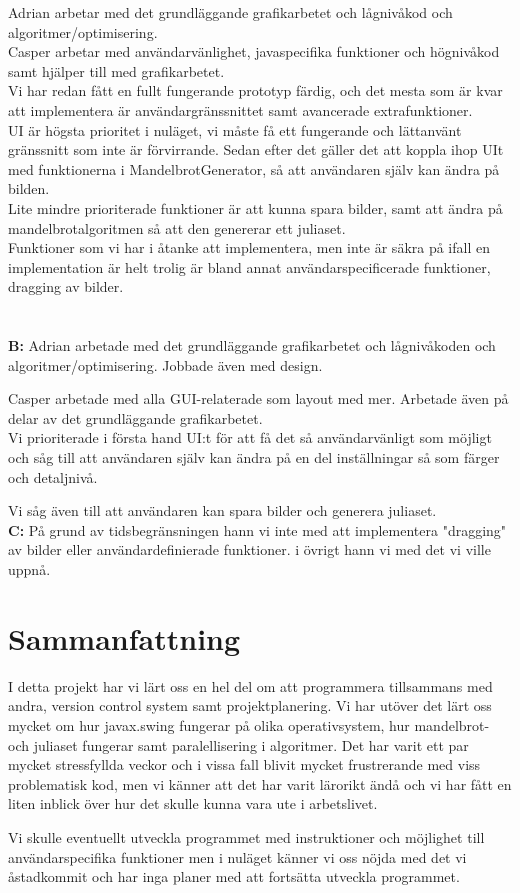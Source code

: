 \documentclass[11pt]{article} %
\begin{document}

\noindent Adrian arbetar med det grundläggande grafikarbetet och lågnivåkod och algoritmer/optimisering. \\

\noindent Casper arbetar med användarvänlighet, javaspecifika funktioner och högnivåkod samt hjälper till med grafikarbetet. \\

\noindent Vi har redan fått en fullt fungerande prototyp färdig, och det mesta som är kvar att implementera är användargränssnittet samt avancerade extrafunktioner. \\

\noindent UI är högsta prioritet i nuläget, vi måste få ett fungerande och lättanvänt gränssnitt som inte är förvirrande. Sedan efter det gäller det att koppla ihop UIt med funktionerna i MandelbrotGenerator, så att användaren själv kan ändra på bilden. \\

\noindent Lite mindre prioriterade funktioner är att kunna spara bilder, samt att ändra på mandelbrotalgoritmen så att den genererar ett juliaset. \\

\noindent Funktioner som vi har i åtanke att implementera, men inte är säkra på ifall en implementation är helt trolig är bland annat användarspecificerade funktioner, dragging av bilder. \\
\\
\\
{\bf B:} \noindent Adrian arbetade med det grundläggande grafikarbetet och lågnivåkoden och algoritmer/optimisering. Jobbade även med design.

\noindent Casper arbetade med alla GUI-relaterade som layout med mer. Arbetade även på delar av det grundläggande grafikarbetet.
\\
\noindent Vi prioriterade i första hand UI:t för att få det så användarvänligt som möjligt och såg till att användaren själv kan ändra på en del inställningar så som färger och detaljnivå.

Vi såg även till att användaren kan spara bilder och generera juliaset.
\\
{\bf C:} På grund av tidsbegränsningen hann vi inte med att implementera "dragging" av bilder eller användardefinierade funktioner. i övrigt hann vi med det vi ville uppnå.

\section{Sammanfattning}
I detta projekt har vi lärt oss en hel del om att programmera tillsammans med andra, version control system samt projektplanering. Vi har utöver det lärt oss mycket om hur javax.swing fungerar på olika operativsystem, hur mandelbrot- och juliaset fungerar samt paralellisering i algoritmer. Det har varit ett par mycket stressfyllda veckor och i vissa fall blivit mycket frustrerande med viss problematisk kod, men vi känner att det har varit lärorikt ändå och vi har fått en liten inblick över hur det skulle kunna vara ute i arbetslivet.

Vi skulle eventuellt utveckla programmet med instruktioner och möjlighet till användarspecifika funktioner men i nuläget känner vi oss nöjda med det vi åstadkommit och har inga planer med att fortsätta utveckla programmet.
\end{document}
